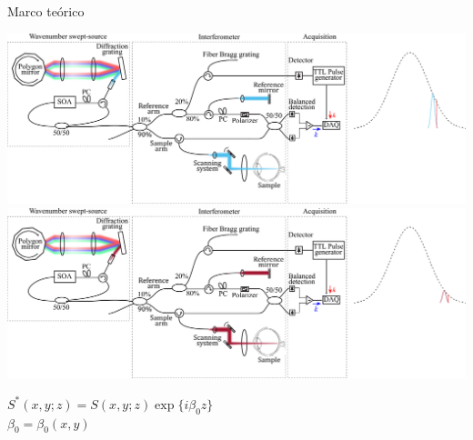 \documentclass[fleqn,10pt,aspectratio=169,dvipsnames]{beamer}
\begin{document}
\begin{frame}[c]{Marco teórico}{}
\begin{overprint}
\includegraphics[width=\textwidth]{Figuras/SSOCT_Jitter_6}
\includegraphics[width=\textwidth]{Figuras/SSOCT_Jitter_7}
	\end{overprint}

\vspace{\baselineskip}
{
	\begin{centering}
$S^\ast (x, y; z) = S(x, y; z) \exp\{i\beta_0z\}$ \\
$\beta_0 = \beta_0(x, y)$ \\
	\end{centering}
}
\end{frame}
\end{document}
